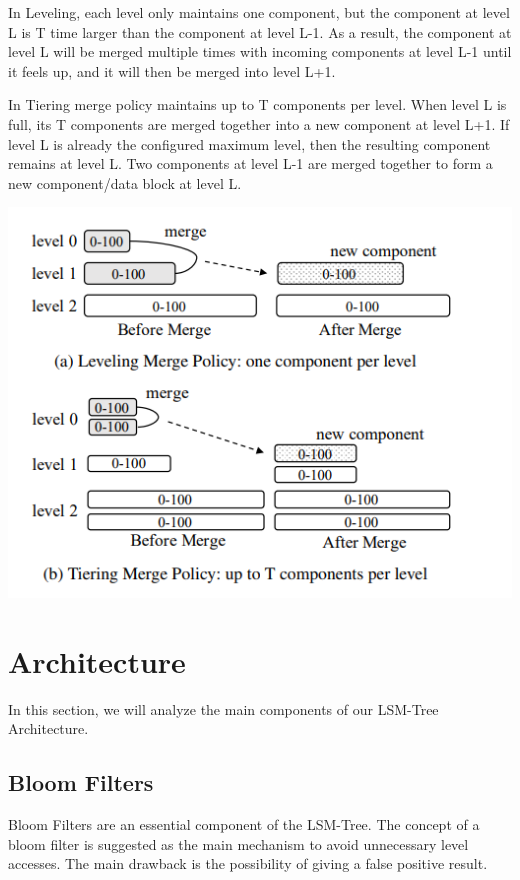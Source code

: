 \documentclass[sigconf]{acmart}
\begin{document}
    In Leveling, each level only maintains one component, but the component at level L is T time larger than the component at level L-1. As a result, the component at level L will be merged multiple times with incoming components at level L-1 until it feels up, and it will then be merged into level L+1.

    In Tiering merge policy maintains up to T components per level. When level L is full, its T components are merged together into a new component at level L+1. If level L is already the configured maximum level, then the resulting component remains at level L. Two components at level L-1 are merged together to form a new component/data block at level L.

    \includegraphics{images/MergingStrategies.PNG}

    \section{Architecture}
    In this section, we will analyze the main components of our LSM-Tree Architecture.
    \subsection{Bloom Filters}
    Bloom Filters are an essential component of the LSM-Tree. The concept of a bloom filter is suggested as the main mechanism to avoid unnecessary level accesses. The main drawback is the possibility of giving a false positive result.
\end{document}
